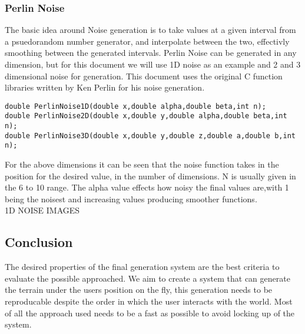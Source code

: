 \subsubsection*{Perlin Noise}


The basic idea around Noise generation is to take values at a given interval from
a psuedorandom number generator, and interpolate between the two, effectivly 
smoothing between the generated intervals. Perlin Noise can be generated in any
dimension, but for this document we will use 1D noise as an example and 2 and 
3 dimensional noise for generation. This document uses the original C function
libraries written by Ken Perlin for his noise generation.\\ 

\begin{lstlisting}
double PerlinNoise1D(double x,double alpha,double beta,int n);
double PerlinNoise2D(double x,double y,double alpha,double beta,int n);
double PerlinNoise3D(double x,double y,double z,double a,double b,int n);
\end{lstlisting}

For the above dimensions it can be seen that the noise function takes in the 
position for the desired value, in the number of dimensions. N is usually given
in the 6 to 10 range. The alpha value effects how noisy the final values are,with
1 being the noisest and increasing values producing smoother functions.\\

1D NOISE IMAGES\\


\subsection{Conclusion}
The desired properties of the final generation system are the best criteria to
evaluate the possible approached. We aim to create a system that can generate
the terrain under the users position on the fly, this generation needs to be
reproducable despite the order in which the user interacts with the world. Most
of all the approach used needs to be a fast as possible to avoid locking up of
the system.\\

